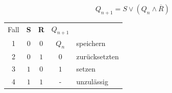 \begin{equation*}
    Q_{n + 1} = S \lor \left(Q_n \land \overline{R}\right)
\end{equation*}
\begin{center}
    \begin{tabular}{c|c c|c l}
        Fall & \textbf{S} & \textbf{R} & $Q_{n + 1}$ & \\
        \cline{1-4}
        1 & $0$ & $0$ & $Q_n$ & speichern\\        
        2 & $0$ & $1$ & $0$ & zurücksetzten\\        
        3 & $1$ & $0$ & $1$ & setzen\\        
        4 & $1$ & $1$ & - & unzulässig\\        
    \end{tabular}
\end{center}
